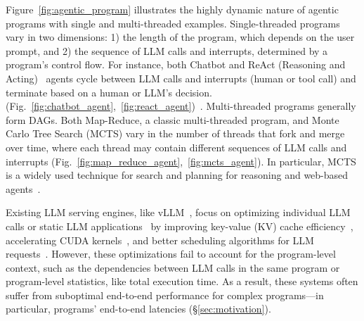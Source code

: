 Figure~\ref{fig:agentic_program} illustrates the highly dynamic nature of agentic programs with single and multi-threaded examples. Single-threaded programs vary in two dimensions: 1) the length of the program, which depends on the user prompt, and 2) the sequence of LLM calls and interrupts, determined by a program's control flow. For instance, both Chatbot and ReAct (Reasoning and Acting)~\cite{yao2023reactsynergizingreasoningacting} agents cycle between LLM calls and interrupts (human or tool call) and terminate based on a human or LLM's decision. (Fig.~\ref{fig:chatbot_agent},~\ref{fig:react_agent})~\cite{yao2023reactsynergizingreasoningacting}. Multi-threaded programs generally form DAGs. Both Map-Reduce, a classic multi-threaded program, and Monte Carlo Tree Search (MCTS) vary in the number of threads that fork and merge over time, where each thread may contain different sequences of LLM calls and interrupts (Fig.~\ref{fig:map_reduce_agent},~\ref{fig:mcts_agent}). In particular, MCTS is a widely used technique for search and planning for reasoning and web-based agents~\cite{zhou2024languageagenttreesearch, putta2024agentqadvancedreasoning, sequoia2024generative, muennighoff2025s1simpletesttimescaling}.

Existing LLM serving engines, like vLLM~\cite{vllm}, focus on optimizing individual LLM calls or static LLM applications~\cite{lin2024parrotefficientservingllmbased} by improving key-value (KV) cache efficiency~\cite{vllm, zheng2024sglangefficientexecutionstructured}, accelerating CUDA kernels~\cite{nanoflow,fastserve}, and better scheduling algorithms for LLM requests~\cite{fastserve, agrawal2024tamingthroughputlatencytradeoffllm}. However, these optimizations fail to account for the program-level context, such as the dependencies between LLM calls in the same program or program-level statistics, like total execution time. As a result, these systems often suffer from suboptimal end-to-end performance for complex programs—in particular, programs' end-to-end latencies (\S\ref{sec:motivation}).

